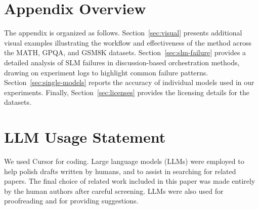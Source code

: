 
\newpage

\section*{Appendix Overview}


The appendix is organized as follows. Section~\ref{sec:visual} presents additional visual examples illustrating the workflow and effectiveness of the \NAME{} method across the MATH, GPQA, and GSM8K datasets. Section~\ref{sec:slm-failure} provides a detailed analysis of SLM failures in discussion-based orchestration methods, drawing on experiment logs to highlight common failure patterns. Section~\ref{sec:single-models} reports the accuracy of individual models used in our experiments. Finally, Section~\ref{sec:licenses} provides the licensing details for the datasets.


\section{LLM Usage Statement}
\label{sec:usage}

We used Cursor for coding. Large language models (LLMs) were employed to help polish drafts written by humans, and to assist in searching for related papers. The final choice of related work included in this paper was made entirely by the human authors after careful screening. LLMs were also used for proofreading and for providing suggestions.



